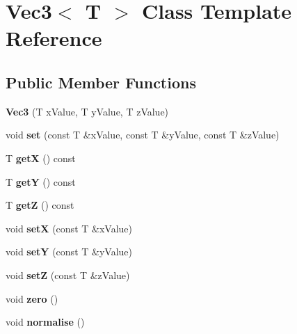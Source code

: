 \hypertarget{classVec3}{}\section{Vec3$<$ T $>$ Class Template Reference}
\label{classVec3}
\subsection*{Public Member Functions}
\begin{DoxyCompactItemize}
\item 
\mbox{\label{classVec3_ae5f1be1f4936b564b8ef760dded77f93}} 
{\bfseries Vec3} (T x\+Value, T y\+Value, T z\+Value)
\item 
\mbox{\label{classVec3_a9003d0d159f619d62400cf865ca9d47b}} 
void {\bfseries set} (const T \&x\+Value, const T \&y\+Value, const T \&z\+Value)
\item 
\mbox{\label{classVec3_ad259e243f6678730d990acbae2cdff57}} 
T {\bfseries getX} () const
\item 
\mbox{\label{classVec3_a8eeb16262b7e619f081a1ba94df098f8}} 
T {\bfseries getY} () const
\item 
\mbox{\label{classVec3_a52f0db1c387aa9bc7befe5792b698553}} 
T {\bfseries getZ} () const
\item 
\mbox{\label{classVec3_a21ee2109bbc2148c61a24b9dafcc12d6}} 
void {\bfseries setX} (const T \&x\+Value)
\item 
\mbox{\label{classVec3_a84a46865f7c4c2bed1305406485ee14f}} 
void {\bfseries setY} (const T \&y\+Value)
\item 
\mbox{\label{classVec3_a11b21f7d675879b42aaf278031d8b012}} 
void {\bfseries setZ} (const T \&z\+Value)
\item 
\mbox{\label{classVec3_af7bb8aacd55941d3969edf51c4e82179}} 
void {\bfseries zero} ()
\item 
\mbox{\label{classVec3_a57837eb6a03008ae0b9efe1752ed3493}} 
void {\bfseries normalise} ()
\item 

\end{DoxyCompactItemize}
